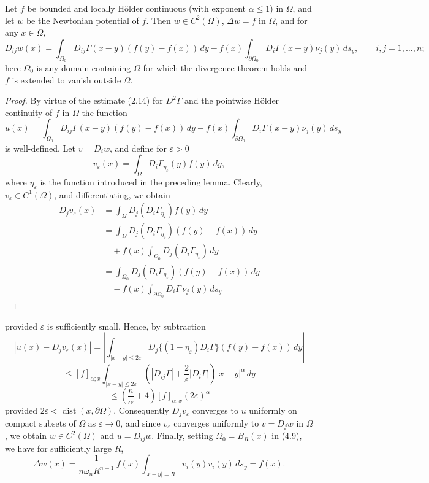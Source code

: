 
\begin{lemma}\label{gt:lem-newtonian-c2}
Let $f$ be bounded and locally H\"older continuous (with exponent $\alpha \le 1$) in $\Omega$, and let $w$ be the Newtonian potential of $f$. Then $w \in C^2(\Omega)$, $\Delta w = f$ in $\Omega$, and for any $x \in \Omega$,
\begin{equation}\tag{4.9}
D_{ij}w(x)=\int_{\Omega_0} D_{ij}\Gamma(x-y)(f(y)-f(x))\,dy
-f(x)\int_{\partial\Omega_0} D_i\Gamma(x-y)\nu_j(y)\,ds_y,\qquad i,j=1,\ldots,n;
\end{equation}
here $\Omega_0$ is any domain containing $\Omega$ for which the divergence theorem holds and $f$ is extended to vanish outside $\Omega$.

\begin{proof}
By virtue of the estimate (2.14) for $D^2\Gamma$ and the pointwise H\"older continuity of $f$ in $\Omega$ the function
\[
u(x)=\int_{\Omega_0} D_{ij}\Gamma(x-y)(f(y)-f(x))\,dy - f(x)\int_{\partial\Omega_0} D_i\Gamma(x-y)\nu_j(y)\,ds_y
\]
is well-defined. Let $v=D_i w$, and define for $\varepsilon>0$
\[
v_\varepsilon(x)=\int_{\Omega} D_i\Gamma_{\eta_\varepsilon}(y)f(y)\,dy,
\]
where $\eta_\varepsilon$ is the function introduced in the preceding lemma. Clearly, $v_\varepsilon\in C^1(\Omega)$, and differentiating, we obtain
\begin{align*}
D_j v_\varepsilon(x) &= \int_{\Omega} D_j(D_i\Gamma_{\eta_\varepsilon})f(y)\,dy \\
&= \int_{\Omega} D_j(D_i\Gamma_{\eta_\varepsilon})(f(y)-f(x))\,dy \\
&\quad + f(x)\int_{\Omega_0} D_j(D_i\Gamma_{\eta_\varepsilon})\,dy \\
&= \int_{\Omega_0} D_j(D_i\Gamma_{\eta_\varepsilon})(f(y)-f(x))\,dy \\
&\quad - f(x)\int_{\partial\Omega_0} D_i\Gamma\,\nu_j(y)\,ds_y
\end{align*}
\end{proof}
\end{lemma}




provided $\varepsilon$ is sufficiently small. Hence, by subtraction
\[
\left|u(x)-D_j v_\varepsilon(x)\right|
=
\left|
\int_{|x-y|\leq 2\varepsilon}
D_j\{(1-\eta_\varepsilon)D_i\Gamma\}(f(y)-f(x))\,dy
\right|
\]
\[
\leq [f]_{\alpha;x}
\int_{|x-y|\leq 2\varepsilon}
\left(|D_{ij}\Gamma|+\frac{2}{\varepsilon}|D_i\Gamma|\right)|x-y|^\alpha\,dy
\]
\[
\leq \left(\frac{n}{\alpha}+4\right)[f]_{\alpha;x}(2\varepsilon)^\alpha
\]
provided $2\varepsilon<\operatorname{dist}(x,\partial\Omega)$. Consequently $D_j v_\varepsilon$ converges to $u$ uniformly on compact
subsets of $\Omega$ as $\varepsilon\to 0$, and since $v_\varepsilon$ converges uniformly to $v=D_j w$ in $\Omega$, we obtain
$w\in C^2(\Omega)$ and $u=D_{ij}w$. Finally, setting $\Omega_0=B_R(x)$ in (4.9), we have for sufficiently
large $R$,
\[
\Delta w(x)=\frac{1}{n\omega_n R^{n-1}}\,f(x)\int_{|x-y|=R} v_i(y)v_i(y)\,ds_y=f(x).
\]

